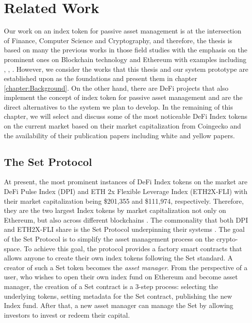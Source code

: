\chapter{Related Work}\label{chap:RelatedWork}

Our work on an index token for passive asset management is at the intersection of Finance, Computer Science and Cryptography, and therefore, the thesis is based on many the previous works in those field studies with the emphasis on the prominent ones on Blockchain technology and Ethereum with examples including \cite{satoshi2008peer}, \cite{wood2014ethereum}, \cite{buterin2014next}. However, we consider the works that this thesis and our system prototype are established upon as the foundations and present them in chapter \ref{chapter:Background}. On the other hand, there are DeFi projects that also implement the concept of index token for passive asset management and are the direct alternatives to the system we plan to develop. In the remaining of this chapter, we will select and discuss some of the most noticeable DeFi Index tokens on the current market based on their market capitalization from Coingecko \cite{geckoDefiIndexByCap} and the availability of their publication papers including white and yellow papers.


\section{The Set Protocol}

At present, the most prominent instances of DeFi Index tokens on the market are DeFi Pulse Index (DPI) and ETH 2x Flexible Leverage Index (ETH2X-FLI) with their market capitalization being \$201,355 and \$111,974, respectively. Therefore, they are the two largest Index tokens by market capitalization not only on Ethereum, but also across different blockchains \cite{geckoDefiIndexByCap}. The commonality that both DPI and ETH2X-FLI share is the Set Protocol underpinning their systems \cite{tokensetsExplore}. The goal of the Set Protocol \cite{setprotocolwhitepaper} is to simplify the asset management process on the crypto-space. To achieve this goal, the protocol provides a factory smart contracts that allows anyone to create their own index tokens following the Set standard. A creator of such a Set token becomes the \textit{asset manager}. From the perspective of a user, who wishes to open their own index fund on Ethereum and become asset manager, the creation of a Set contract is a 3-step process: selecting the underlying tokens, setting metadata for the Set contract, publishing the new Index fund. After that, a new asset manager can manage the Set by allowing investors to invest or redeem their capital. 


